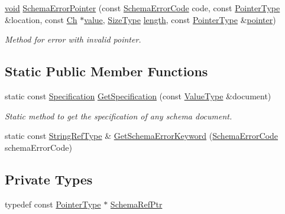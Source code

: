 \begin{DoxyCompactItemize}
\hyperlink{imgui__impl__opengl3__loader_8h_ac668e7cffd9e2e9cfee428b9b2f34fa7}{void} \hyperlink{classGenericSchemaDocument_aff66d9c52fad15e3bba4e5743598ab71}{Schema\+Error\+Pointer} (const \hyperlink{group__RAPIDJSON__ERRORS_ga64f496d2cee8c9673f3105ec6008f290}{Schema\+Error\+Code} code, const \hyperlink{classGenericSchemaDocument_aeb62f562d4dc024402b00f97cbcef747}{Pointer\+Type} \&location, const \hyperlink{classGenericSchemaDocument_ab1dec56a78b29649eb8e4b85b101ec7c}{Ch} $\ast$\hyperlink{imgui__impl__opengl3__loader_8h_a32aff7c6c4cd253fdf6563677afab5ce}{value}, \hyperlink{rapidjson_8h_a5ed6e6e67250fadbd041127e6386dcb5}{Size\+Type} \hyperlink{imgui__impl__opengl3__loader_8h_a011fc24f10426c01349e94a4edd4b0d5}{length}, const \hyperlink{classGenericSchemaDocument_aeb62f562d4dc024402b00f97cbcef747}{Pointer\+Type} \&\hyperlink{imgui__impl__opengl3__loader_8h_aae1f8d263916ad71bd415381591549c0}{pointer})
\begin{DoxyCompactList}\small\item\em Method for error with invalid pointer. \end{DoxyCompactList}\end{DoxyCompactItemize}
\subsection*{Static Public Member Functions}
\begin{DoxyCompactItemize}
\item 
static const \hyperlink{structSpecification}{Specification} \hyperlink{classGenericSchemaDocument_a9c47f4621a9e782f0de037bb1449ba9c}{Get\+Specification} (const \hyperlink{classGenericSchemaDocument_ae246f1b6573a5a8a2c0d73d4eb64d53a}{Value\+Type} \&document)
\begin{DoxyCompactList}\small\item\em Static method to get the specification of any schema document. \end{DoxyCompactList}\item 
static const \hyperlink{classGenericSchemaDocument_adc77ed1f500a224582385ff730de1aa3}{String\+Ref\+Type} \& \hyperlink{classGenericSchemaDocument_ab4a5e8f045c9d912e1078b55267174f9}{Get\+Schema\+Error\+Keyword} (\hyperlink{group__RAPIDJSON__ERRORS_ga64f496d2cee8c9673f3105ec6008f290}{Schema\+Error\+Code} schema\+Error\+Code)
\end{DoxyCompactItemize}
\subsection*{Private Types}
\begin{DoxyCompactItemize}
\item 
typedef const \hyperlink{classGenericSchemaDocument_aeb62f562d4dc024402b00f97cbcef747}{Pointer\+Type} $\ast$ \hyperlink{classGenericSchemaDocument_a2d829a5745e7d28aa3b1e33366b9861d}{Schema\+Ref\+Ptr}
\end{DoxyCompactItemize}
